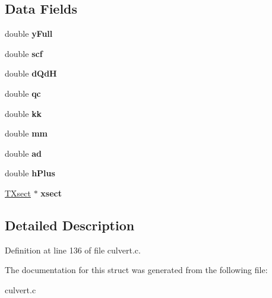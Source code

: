 \subsection*{Data Fields}
\begin{DoxyCompactItemize}
\item 
\mbox{\label{struct_t_culvert_acb88aefbbf3fdd60eb4b725c342d17e3}} 
double {\bfseries y\+Full}
\item 
\mbox{\label{struct_t_culvert_ad6b41d98182e53577898ab4ea073c60e}} 
double {\bfseries scf}
\item 
\mbox{\label{struct_t_culvert_ad8ad0e4aa95369f4d5241a3374ce1c4a}} 
double {\bfseries d\+QdH}
\item 
\mbox{\label{struct_t_culvert_ab50d58782a52516a2af7ff772dde89ae}} 
double {\bfseries qc}
\item 
\mbox{\label{struct_t_culvert_aa8dc517ed813a92facdeb8d26f5e9131}} 
double {\bfseries kk}
\item 
\mbox{\label{struct_t_culvert_a449096db5241985d28abca645025ac43}} 
double {\bfseries mm}
\item 
\mbox{\label{struct_t_culvert_a48474ce7ab6c9a97aec905ce29810906}} 
double {\bfseries ad}
\item 
\mbox{\label{struct_t_culvert_aae66f18661f1d4ef022f4d11672786f1}} 
double {\bfseries h\+Plus}
\item 
\mbox{\label{struct_t_culvert_a5a90779608e555fc22b50c1d04e132be}} 
\hyperlink{struct_t_xsect}{T\+Xsect} $\ast$ {\bfseries xsect}
\end{DoxyCompactItemize}


\subsection{Detailed Description}


Definition at line 136 of file culvert.\+c.



The documentation for this struct was generated from the following file\+:\begin{DoxyCompactItemize}
\item 
culvert.\+c\end{DoxyCompactItemize}
